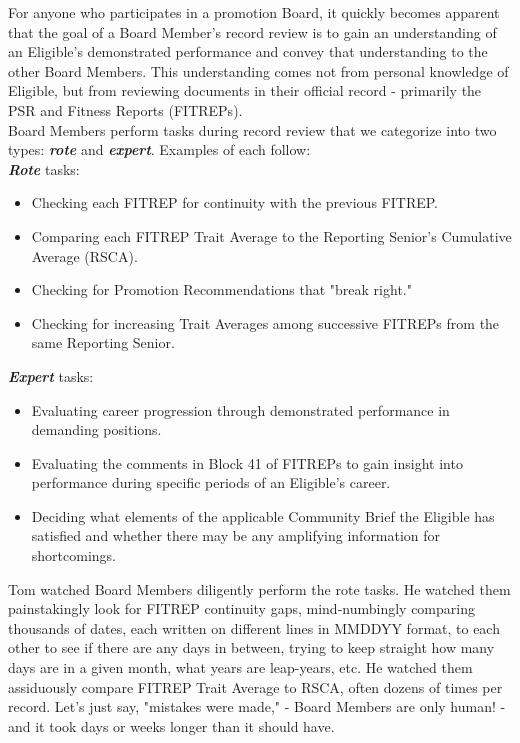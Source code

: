 \documentclass[UTF8]{article}
\begin{document}
For anyone who participates in a promotion Board, it quickly becomes apparent
that the goal of a Board Member's record review is to gain an understanding of
an Eligible's demonstrated performance and convey that understanding to the
other Board Members. This understanding comes not from personal knowledge of
Eligible, but from reviewing documents in their official record - primarily the
PSR and Fitness Reports (FITREPs).\\


Board Members perform tasks during record review that we categorize into two
types:
\textit{\textbf{rote}} and \textit{\textbf{expert}}. Examples of each follow:\\

\textit{\textbf{Rote}} tasks: 
\begin{itemize}
  \item Checking each FITREP for continuity with the previous FITREP.
  \item Comparing each FITREP Trait Average to the Reporting Senior's Cumulative
  Average (RSCA).
  \item Checking for Promotion Recommendations that "break right."
  \item Checking for increasing Trait Averages among successive FITREPs from the
  same Reporting Senior. 
\end{itemize}

\textit{\textbf{Expert}} tasks: 
\begin{itemize}
  \item Evaluating career progression through demonstrated performance in
  demanding positions.
  \item Evaluating the comments in Block 41 of FITREPs to gain insight into 
  performance during specific periods of an Eligible's career.
  \item Deciding what elements of the applicable Community Brief the Eligible
  has satisfied and whether there may be any amplifying information for
  shortcomings.
\end{itemize}

Tom watched Board Members diligently perform the rote tasks. He watched them 
painstakingly look for FITREP continuity gaps, mind-numbingly comparing thousands 
of dates, each written on different lines in MMDDYY format, to each other to see 
if there are any days in between, trying to keep straight how many days are in a
given month, what years are leap-years, etc. He watched them assiduously compare 
FITREP Trait Average to RSCA, often dozens of times per record. Let's just say, 
"mistakes were made," - Board Members are only human! - and it took days or weeks
longer than it should have. \\
\end{document}
